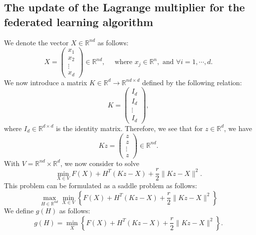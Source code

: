 \begin{itemize}
\section{The update of the Lagrange multiplier for the federated learning algorithm} 

We denote the vector $X \in \mathbb{R}^{nd}$ as follows: 
\begin{equation}
X = \left ( \begin{array}{c} x_1 \\ x_2 \\ \vdots \\ x_d \end{array} \right ) \in \mathbb{R}^{nd}, \quad \mbox{ where } x_j \in \mathbb{R}^{n}, \mbox{ and } \forall i=1,\cdots,d. 
\end{equation}
We now introduce a matrix $K \in \mathbb{R}^{d} \rightarrow \mathbb{R}^{nd \times d}$ defined by the following relation: 
\begin{equation} 
K = \left ( \begin{array}{c} I_d \\ I_d \\ \vdots \\ I_d \end{array} \right ), 
\end{equation}
where $I_d \in \mathbb{R}^{d\times d}$ is the identity matrix. Therefore, we see that for $z \in \mathbb{R}^{d}$, we have 
\begin{equation} 
K z = \left ( \begin{array}{c} z \\ z \\ \vdots \\ z \end{array} \right ) \in \mathbb{R}^{nd}. 
\end{equation} 
With $V = \mathbb{R}^{nd} \times \mathbb{R}^d$, we now consider to solve 
\begin{equation} 
\min_{X \in V } F(X) + H^T(Kz - X) + \frac{r}{2} \|Kz - X\|^2. 
\end{equation} 
This problem can be formulated as a saddle problem as follows: 
\begin{equation}\label{main:eq} 
\max_{H \in \mathbb{R}^{nd}}  \min_{X \in V} \left \{ F(X) + H^T (Kz - X) + \frac{r}{2} \|Kz - X\|^2 \right \}
\end{equation}
We define $g(H)$ as follows: 
\begin{equation}\label{gfunction}
g(H) = \min_{X} \left \{ F(X) + H^T (Kz - X) + \frac{r}{2} \|Kz - X\|^2 \right \}. 

\end{equation}
\end{itemize}
